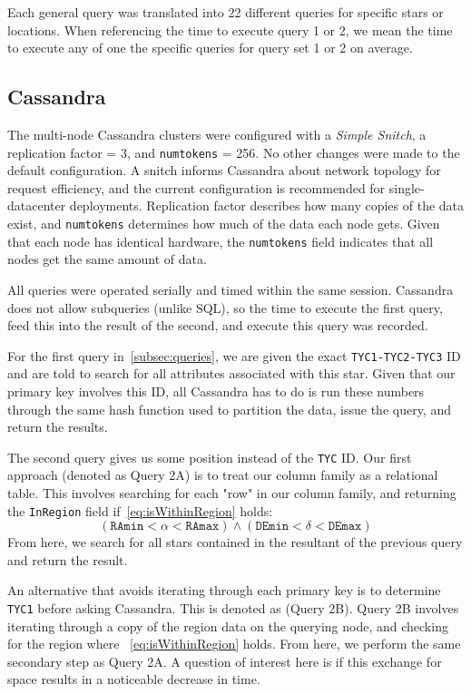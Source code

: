 Each general query was translated into 22 different queries for specific stars or locations.
When referencing the time to execute query 1 or 2, we mean the time to execute any of one the specific queries for
query set 1 or 2 on average.

\subsection{Cassandra}\label{subsec:cassandra}
The multi-node Cassandra clusters were configured with a \textit{Simple Snitch}, a replication factor = 3, and
\texttt{num\textunderscore tokens} = 256.
No other changes were made to the default configuration.
A snitch informs Cassandra about network topology for request efficiency, and the current configuration
is recommended for single-datacenter deployments.
Replication factor describes how many copies of the data exist, and \texttt{num\textunderscore tokens} determines
how much of the data each node gets.
Given that each node has identical hardware, the \texttt{num\textunderscore tokens} field indicates that all nodes
get the same amount of data.

All queries were operated serially and timed within the same session.
Cassandra does not allow subqueries (unlike SQL), so the time to execute the first query, feed this
into the result of the second, and execute this query was recorded.

For the first query in~\autoref{subsec:queries}, we are given the exact \texttt{TYC1-TYC2-TYC3} ID and are told to
search for all attributes associated with this star.
Given that our primary key involves this ID, all Cassandra has to do is run these numbers through the same hash function
used to partition the data, issue the query, and return the results.

The second query gives us some position instead of the \texttt{TYC} ID\@.
Our first approach (denoted as Query 2A) is to treat our column family as a relational table.
This involves searching for each "row" in our column family, and returning the \texttt{InRegion} field
if~\autoref{eq:isWithinRegion} holds:
\begin{equation}\label{eq:isWithinRegion}
    \left(\texttt{RAmin} < \alpha < \texttt{RAmax}\right) \land \left(\texttt{DEmin} < \delta < \texttt{DEmax}\right)
\end{equation}
From here, we search for all stars contained in the resultant of the previous query and return the result.

An alternative that avoids iterating through each primary key is to determine \texttt{TYC1} before asking Cassandra.
This is denoted as (Query 2B).
Query 2B involves iterating through a copy of the region data on the querying node, and checking for the region where
~\autoref{eq:isWithinRegion} holds.
From here, we perform the same secondary step as Query 2A\@.
A question of interest here is if this exchange for space results in a noticeable decrease in time.

